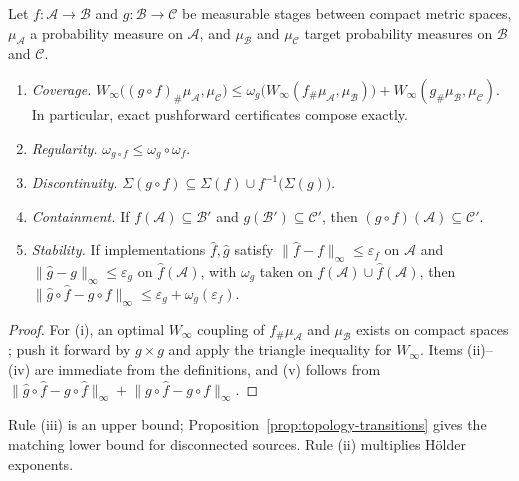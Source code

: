 \begin{proposition}
  \label{prop:composition}
  Let $f\colon \mathcal{A}\to \mathcal{B}$ and $g\colon \mathcal{B}\to \mathcal{C}$ be measurable stages between compact metric spaces, $\mu_{\mathcal{A}}$ a probability measure on $\mathcal{A}$, and $\mu_{\mathcal{B}}$ and $\mu_{\mathcal{C}}$ target probability measures on $\mathcal{B}$ and $\mathcal{C}$.
  \begin{enumerate}[label=(\roman*)]
    \item \emph{Coverage.} $W_\infty\bigl((g\circ f)_\#\mu_{\mathcal{A}},\mu_{\mathcal{C}}\bigr)\leq\omega_g\bigl(W_\infty(f_\#\mu_{\mathcal{A}},\mu_{\mathcal{B}})\bigr)+W_\infty(g_\#\mu_{\mathcal{B}},\mu_{\mathcal{C}})$. In particular, exact pushforward certificates compose exactly.
    \item \emph{Regularity.} $\omega_{g\circ f}\leq\omega_g\circ\omega_f$.
    \item \emph{Discontinuity.} $\Sigma(g\circ f)\subseteq\Sigma(f)\cup f^{-1}\bigl(\Sigma(g)\bigr)$.
    \item \emph{Containment.} If $f(\mathcal{A})\subseteq \mathcal{B}'$ and $g(\mathcal{B}')\subseteq \mathcal{C}'$, then $(g\circ f)(\mathcal{A})\subseteq \mathcal{C}'$.
    \item \emph{Stability.} If implementations $\hat f,\hat g$ satisfy $\lVert\hat f-f\rVert_\infty\leq\varepsilon_f$ on $\mathcal{A}$ and $\lVert\hat g-g\rVert_\infty\leq\varepsilon_g$ on $\hat f(\mathcal{A})$, with $\omega_g$ taken on $f(\mathcal{A})\cup\hat f(\mathcal{A})$, then $\lVert\hat g\circ\hat f-g\circ f\rVert_\infty\leq\varepsilon_g+\omega_g(\varepsilon_f)$.
  \end{enumerate}
\end{proposition}
\begin{proof}
  For (i), an optimal $W_\infty$ coupling of $f_\#\mu_{\mathcal{A}}$ and $\mu_{\mathcal{B}}$ exists on compact spaces \cite{champion2008infinity}; push it forward by $g\times g$ and apply the triangle inequality for $W_\infty$. Items (ii)--(iv) are immediate from the definitions, and (v) follows from $\lVert\hat g\circ\hat f-g\circ\hat f\rVert_\infty+\lVert g\circ\hat f-g\circ f\rVert_\infty$.
\end{proof}
Rule (iii) is an upper bound; Proposition~\ref{prop:topology-transitions} gives the matching lower bound for disconnected sources. Rule (ii) multiplies H\"older exponents.

